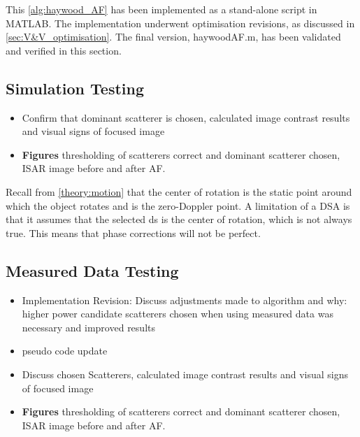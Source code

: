 \documentclass[class=report,11pt,crop=false]{standalone}
\begin{document}
    This \autoref{alg:haywood_AF} has been implemented as a stand-alone script in \textsc{MATLAB}. The implementation underwent optimisation revisions, as discussed in \autoref{sec:V&V_optimisation}. The final version, haywoodAF.m, has been validated and verified in this section.
    
    \subsection{Simulation Testing}
    \begin{itemize}
        \item Confirm that dominant scatterer is chosen, calculated image contrast results and visual signs of focused image
        \item \textbf{Figures} thresholding of scatterers correct and dominant scatterer chosen, ISAR image before and after AF.
    \end{itemize}

    Recall from \autoref{theory:motion} that the center of rotation is the static point around which the object rotates and is the zero-Doppler point. A limitation of a \gls{DSA} is that it assumes that the selected \gls{ds} is the center of rotation, which is not always true. This means that phase corrections will not be perfect.
    \subsection{Measured Data Testing}
    \begin{itemize}
        \item Implementation Revision: Discuss adjustments made to algorithm and why: higher power candidate scatterers chosen when using measured data was necessary and improved results
        \item pseudo code update
        \item Discuss chosen Scatterers, calculated image contrast results and visual signs of focused image
        \item \textbf{Figures} thresholding of scatterers correct and dominant scatterer chosen, ISAR image before and after AF.
    \end{itemize}

\end{document}
